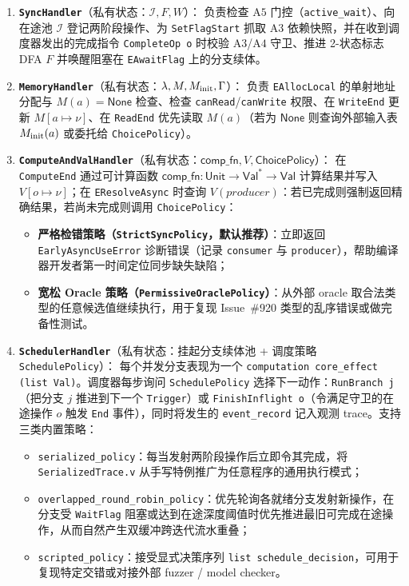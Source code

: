 \documentclass[UTF8,a4paper,11pt,fontset=fandol]{ctexart}
\newcommand{\code}[1]{\texttt{#1}}
\newcommand{\kw}[1]{\mathsf{#1}}
\newcommand{\Val}{\mathsf{Val}}
\newcommand{\Unit}{\mathsf{Unit}}
\begin{document}
\begin{enumerate}
\item \textbf{\code{SyncHandler}}（私有状态：$\mathcal I, F, W$）：
  负责检查 $\mathrm{A5}$ 门控（\code{active\_wait}）、向在途池 $\mathcal I$ 登记两阶段操作、为 \code{SetFlagStart} 抓取 $\mathrm{A3}$ 依赖快照，并在收到调度器发出的完成指令 \code{CompleteOp o} 时校验 $\mathrm{A3}$/$\mathrm{A4}$ 守卫、推进 2-状态标志 DFA $F$ 并唤醒阻塞在 \code{EAwaitFlag} 上的分支续体。

\item \textbf{\code{MemoryHandler}}（私有状态：$\lambda, M, M_{\rm init}, \Gamma$）：
  负责 \code{EAllocLocal} 的单射地址分配与 $M(a)=\kw{None}$ 检查、检查 \code{canRead}/\code{canWrite} 权限、在 \code{WriteEnd} 更新 $M[a \mapsto \nu]$、在 \code{ReadEnd} 优先读取 $M(a)$（若为 $\kw{None}$ 则查询外部输入表 $M_{\rm init}(a)$ 或委托给 \code{ChoicePolicy}）。

\item \textbf{\code{ComputeAndValHandler}}（私有状态：$\mathsf{comp\_fn}, V, \mathsf{ChoicePolicy}$）：
  在 \code{ComputeEnd} 通过可计算函数 $\mathsf{comp\_fn} : \Unit \to \Val^* \to \Val$ 计算结果并写入 $V[o \mapsto \nu]$；在 \code{EResolveAsync} 时查询 $V(\mathit{producer})$：若已完成则强制返回精确结果，若尚未完成则调用 \code{ChoicePolicy}：
  \begin{itemize}
  \item \textbf{严格检错策略（\code{StrictSyncPolicy}，默认推荐）}：立即返回 \code{EarlyAsyncUseError} 诊断错误（记录 \code{consumer} 与 \code{producer}），帮助编译器开发者第一时间定位同步缺失缺陷；
  \item \textbf{宽松 Oracle 策略（\code{PermissiveOraclePolicy}）}：从外部 oracle 取合法类型的任意候选值继续执行，用于复现 Issue~\#920 类型的乱序错误或做完备性测试。
  \end{itemize}

\item \textbf{\code{SchedulerHandler}}（私有状态：挂起分支续体池 + 调度策略 \code{SchedulePolicy}）：
  每个并发分支表现为一个 \code{computation core\_effect (list Val)}。调度器每步询问 \code{SchedulePolicy} 选择下一动作：\code{RunBranch j}（把分支 $j$ 推进到下一个 \code{Trigger}）或 \code{FinishInflight o}（令满足守卫的在途操作 $o$ 触发 \code{End} 事件），同时将发生的 \code{event\_record} 记入观测 trace。支持三类内置策略：
  \begin{itemize}
  \item \code{serialized\_policy}：每当发射两阶段操作后立即令其完成，将 \code{SerializedTrace.v} 从手写特例推广为任意程序的通用执行模式；
  \item \code{overlapped\_round\_robin\_policy}：优先轮询各就绪分支发射新操作，在分支受 \code{WaitFlag} 阻塞或达到在途深度阈值时优先推进最旧可完成在途操作，从而自然产生双缓冲跨迭代流水重叠；
  \item \code{scripted\_policy}：接受显式决策序列 \code{list schedule\_decision}，可用于复现特定交错或对接外部 fuzzer / model checker。
  \end{itemize}
\end{enumerate}
\end{document}
